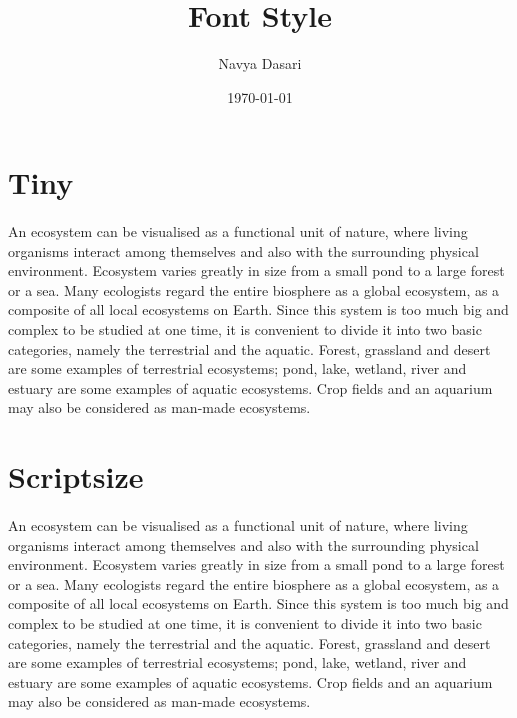 \documentclass[12pt]{article}
\title{Font Style}
\author{Navya Dasari}
\date{\today}
\begin{document}
	
	\maketitle
	\section{Tiny}
	\paragraph{}
	
	
	{\tiny An ecosystem can be visualised as a functional unit of nature, where living 
		organisms interact among themselves and also with the surrounding physical 
		environment. Ecosystem varies greatly in size from a small pond to a large forest or a 
		sea. Many ecologists regard the entire biosphere as a global ecosystem, as a composite 
		of all local ecosystems on Earth. Since this system is too much big and complex to be 
		studied at one time, it is convenient to divide it into two basic categories, namely the 
		terrestrial and the aquatic. Forest, grassland and desert are some examples of terrestrial 
		ecosystems; pond, lake, wetland, river and estuary are some examples of aquatic 
		ecosystems. Crop fields and an aquarium may also be considered as man-made 
		ecosystems. }
	
	\section{Scriptsize}
	\paragraph{}
	
		{\scriptsize An ecosystem can be visualised as a functional unit of nature, where living 
			organisms interact among themselves and also with the surrounding physical 
			environment. Ecosystem varies greatly in size from a small pond to a large forest or a 
			sea. Many ecologists regard the entire biosphere as a global ecosystem, as a composite 
			of all local ecosystems on Earth. Since this system is too much big and complex to be 
			studied at one time, it is convenient to divide it into two basic categories, namely the 
			terrestrial and the aquatic. Forest, grassland and desert are some examples of terrestrial 
			ecosystems; pond, lake, wetland, river and estuary are some examples of aquatic 
			ecosystems. Crop fields and an aquarium may also be considered as man-made 
			ecosystems. }
	
\end{document}
